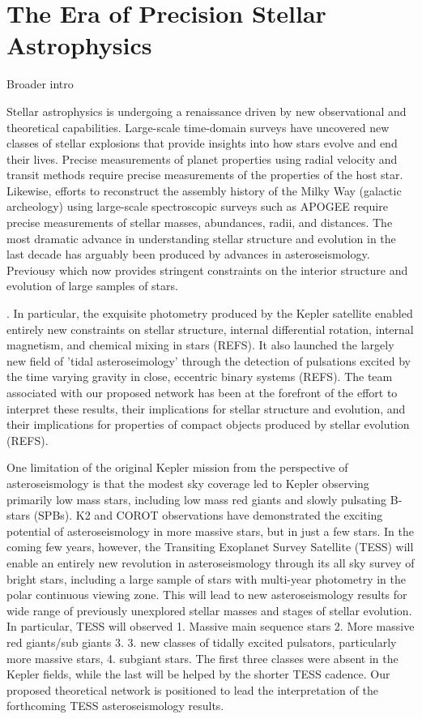 \section{The Era of Precision Stellar Astrophysics}
Broader intro

Stellar astrophysics is undergoing a renaissance driven by new observational and theoretical capabilities. Large-scale time-domain surveys have uncovered new classes of stellar explosions that provide insights into how stars evolve and end their lives.  Precise measurements of planet properties using radial velocity and transit methods require precise measurements of the properties of the host star.  Likewise, efforts to reconstruct the assembly history of the Milky Way (galactic archeology) using large-scale spectroscopic surveys such as APOGEE require precise measurements of stellar masses, abundances, radii, and distances.    The most dramatic advance in understanding stellar structure and evolution in the last decade has arguably been produced by advances in asteroseismology.  Previousy which now provides stringent constraints on the interior structure and evolution of large samples of stars.

.    In particular, the exquisite photometry produced by the Kepler satellite  enabled entirely new constraints on stellar structure, internal differential rotation, internal magnetism, and chemical mixing in stars (REFS).  It also launched the largely new field of 'tidal asteroseimology' through the detection of pulsations excited by the time varying gravity in close, eccentric binary systems (REFS). The team associated with our proposed network has been at the forefront of the effort to interpret these results, their implications for stellar structure and evolution, and their implications for properties of compact objects produced by stellar evolution (REFS).   

One limitation of the original Kepler mission from the perspective of asteroseismology is that the modest sky coverage led to Kepler observing primarily low mass stars, including low mass red giants and slowly pulsating B-stars (SPBs).  K2 and COROT observations have demonstrated the exciting potential of asteroseismology in more massive stars, but in just a few stars.   In the coming few years, however, the Transiting Exoplanet Survey Satellite (TESS) will enable an entirely new revolution in asteroseismology through its all sky survey of bright stars, including a large sample of stars with multi-year photometry in the polar continuous viewing zone.   This will lead to new asteroseismology results for wide range of previously unexplored stellar masses and stages of stellar evolution.   In particular, TESS will observed 1.  Massive main sequence stars 2. More massive red giants/sub giants 3. 3.  new classes of tidally excited pulsators, particularly more massive stars, 4. subgiant stars.   The first three classes were absent in the Kepler fields, while the last will be helped by the shorter TESS cadence.   Our proposed theoretical network is positioned to lead the interpretation of the forthcoming TESS asteroseismology results.  

